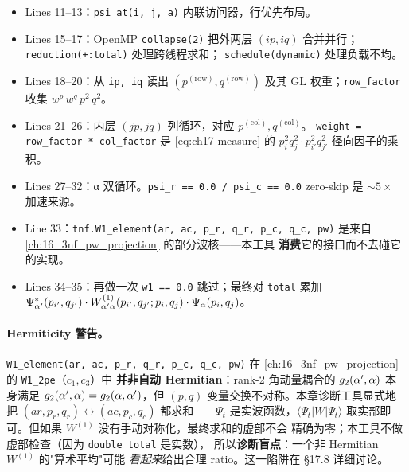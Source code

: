 \begin{itemize}
  \item Lines 11--13：\texttt{psi\_at(i, j, a)} 内联访问器，行优先布局。
  \item Lines 15--17：OpenMP \texttt{collapse(2)} 把外两层 \((ip, iq)\)
        合并并行；\texttt{reduction(+:total)} 处理跨线程求和；
        \texttt{schedule(dynamic)} 处理负载不均。
  \item Lines 18--20：从 \texttt{ip, iq} 读出 \((p^{(\text{row})}, q^{(\text{row})})\)
        及其 GL 权重；\texttt{row\_factor} 收集 \(w^p\,w^q\,p^2\,q^2\)。
  \item Lines 21--26：内层 \((jp, jq)\) 列循环，对应 \(p^{(\text{col})}, q^{(\text{col})}\)。
        \texttt{weight = row\_factor * col\_factor} 是
        \cref{eq:ch17-measure} 的 \(p_i^2 q_j^2 \cdot p_{i'}^2 q_{j'}^2\)
        径向因子的乘积。
  \item Lines 27--32：α 双循环。\texttt{psi\_r == 0.0 / psi\_c == 0.0}
        zero-skip 是 \(\sim 5\times\) 加速来源。
  \item Line 33：\texttt{tnf.W1\_element(ar, ac, p\_r, q\_r, p\_c, q\_c, pw)}
        是来自 \cref{ch:16_3nf_pw_projection} 的部分波核——本工具
        \textbf{消费}它的接口而不去碰它的实现。
  \item Lines 34--35：再做一次 \texttt{w1 == 0.0} 跳过；最终对
        \texttt{total} 累加 \(\Psi^*_{\alpha'}(p_{i'}, q_{j'}) \cdot
        W^{(1)}_{\alpha'\alpha}(p_{i'}, q_{j'};p_i, q_j) \cdot \Psi_\alpha(p_i, q_j)\)。
\end{itemize}

\paragraph{Hermiticity 警告。}
\texttt{W1\_element(ar, ac, p\_r, q\_r, p\_c, q\_c, pw)} 在
\cref{ch:16_3nf_pw_projection} 的 \texttt{W1\_2pe}（\(c_1, c_3\)）中
\textbf{并非自动 Hermitian}：rank-2 角动量耦合的 \(g_2(\alpha', \alpha)\)
本身满足 \(g_2(\alpha', \alpha) = g_2(\alpha, \alpha')\)，但 \((p, q)\)
变量交换不对称。本章诊断工具显式地把 \((ar, p_r, q_r) \leftrightarrow
(ac, p_c, q_c)\) 都求和——\(\Psi_t\) 是实波函数，\(\langle\Psi_t|W|\Psi_t\rangle\)
取实部即可。但如果 \(W^{(1)}\) 没有手动对称化，最终求和的虚部不会
精确为零；本工具不做虚部检查（因为 \texttt{double total} 是实数），
所以\textbf{诊断盲点}：一个非 Hermitian \(W^{(1)}\) 的"算术平均"可能
\emph{看起来}给出合理 ratio。这一陷阱在 §17.8 详细讨论。


